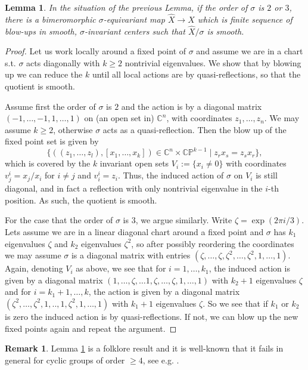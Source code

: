 \documentclass[12pt,reqno]{amsart}
\newtheorem{lem}[thm]{Lemma}
\theoremstyle{definition}
\newtheorem{rem}[thm]{Remark}
\newcommand{\C}{\mathbb{C}}
\newcommand{\CP}{\mathbb{CP}}
\begin{document}
\begin{lem}\label{lem: 2,3}
In the situation of the previous Lemma, if the order of $\sigma$ is $2$ or $3$, there is a bimeromorphic $\sigma$-equivariant map $\hat X\to X$ which is finite sequence of blow-ups in smooth, $\sigma$-invariant centers such that $\hat X/\sigma$ is smooth. 
\end{lem}
\begin{proof}
    Let us work locally around a fixed point of $\sigma$ and assume we are in a chart s.t. $\sigma$ acts diagonally with $k\geq 2$ nontrivial eigenvalues. We show that by blowing up we can reduce the $k$ until all local actions are by quasi-reflections, so that the quotient is smooth.
    
    Assume first the order of $\sigma$ is $2$ and the action is by a diagonal matrix  $(-1,\dots,-1,1,\dots,1)$ on (an open set in) $\C^n$, with coordinates $z_1,\dots,z_n$. We may assume $k\geq 2$, otherwise $\sigma$ acts as a quasi-reflection. Then the blow up of the fixed point set is given by \[\{((z_1,\dots,z_l),[x_1,\dots,x_k])\in \C^n\times \CP^{k-1}\mid z_rx_s=z_sx_r\},\] which is covered by the $k$ invariant open sets $V_i:=\{x_i\neq 0\}$ with coordinates $v^i_j=x_j/x_i$ for $i\neq j$ and $v^i_i=z_i$. Thus, the induced action of $\sigma$ on $V_i$ is still diagonal, and in fact a reflection with only nontrivial eigenvalue in the $i$-th position. As such, the quotient is smooth.

    For the case that the order of $\sigma$ is $3$, we argue similarly. Write $\zeta=\exp(2\pi i/3)$. Lets assume we are in a linear diagonal chart around a fixed point and $\sigma$ has $k_1$ eigenvalues $\zeta$ and $k_2$ eigenvalues $\zeta^2$, so after possibly reordering the coordinates we may assume $\sigma$ is a diagonal matrix with entries $(\zeta,\dots,\zeta,\zeta^2,\dots,\zeta^2,1,\dots,1)$. Again, denoting $V_i$ as above, we see that for $i=1,\dots,k_1$, the induced action is given by a diagonal matrix $(1,\dots,\zeta,\dots1,\zeta,\dots,\zeta,1,\dots,1)$ with $k_2+1$ eigenvalues $\zeta$ and for $i=k_1+1,\dots,k$, the action is given by a diagonal matrix $(\zeta^2,\dots,\zeta^2,1,..,1,\zeta^2,1,\dots,1)$ with $k_1+1$ eigenvalues $\zeta$. So we see that if $k_1$ or $k_2$ is zero the induced action is by quasi-reflections. If not, we can blow up the new fixed points again and repeat the argument.
\end{proof}
\begin{rem}Lemma \ref{lem: 2,3} is a folklore result and it is well-known that it fails in general for cyclic groups of order $\geq 4$, see e.g. \cite[p.31f]{Oda88}.
\end{rem}
\end{document}

